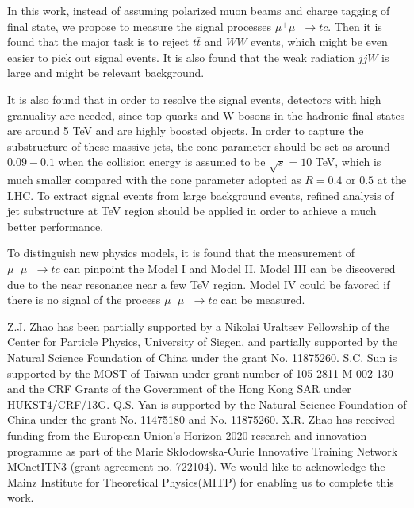\documentclass[a4paper,11pt]{article}
\begin{document}
In this work, instead of assuming polarized muon beams and charge tagging of final state, we propose to measure the signal processes $\mu^+ \mu^- \to t c$. Then it is found that the major task is to reject $t \bar{t}$ and $ W W$ events, which might be even easier to pick out signal events. It is also found that the weak radiation $ j j W$ is large and might be relevant background.

It is also found that in order to resolve the signal events, detectors with high granuality are needed, since top quarks and W bosons in the hadronic final states are around 5 TeV and are highly boosted objects. In order to capture the substructure of these massive jets, the cone parameter should be set as around  $0.09-0.1$ when the collision energy is assumed to be $\sqrt{s}=10$ TeV, which is much smaller compared with the cone parameter adopted as $R=0.4$ or $0.5$ at the LHC. To extract signal events from large background events, refined analysis of jet substructure at TeV region should be applied in order to achieve a much better performance.

To distinguish new physics models, it is found that the measurement of  $\mu^+ \mu^- \to tc$ can pinpoint the Model I and Model II. Model III can be discovered due to the near resonance near a few TeV region. Model IV could be favored if there is no signal of the process $\mu^+ \mu^- \to t c$ can be measured.

	\begin{acknowledgments}
                Z.J. Zhao has been partially supported by a
		Nikolai Uraltsev Fellowship of the Center for Particle Physics,
		University of Siegen, and partially supported by the Natural Science
		Foundation of China under the grant No. 11875260. 
		S.C. Sun is supported by the MOST of Taiwan
		under grant number of 105-2811-M-002-130 and the CRF Grants of the
		Government of the Hong Kong SAR under HUKST4/CRF/13G.  Q.S. Yan 
		is supported by the Natural Science Foundation of China
		under the grant No.  11475180 and No. 11875260.
		X.R. Zhao has received funding from the European Union's Horizon 2020 research 
		and innovation programme as part of the 
		Marie Sk{\l}odowska-Curie Innovative Training Network MCnetITN3 (grant agreement no. 722104).
		We would like to acknowledge the Mainz Institute for Theoretical Physics(MITP) for enabling us to complete this work.

	\end{acknowledgments}

\appendix
	
\end{document}
